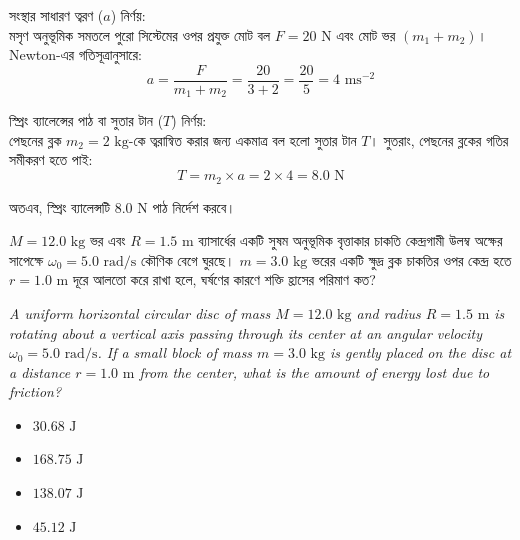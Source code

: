 \documentclass[12pt, a4paper]{article}
\begin{document}
{%
\begin{tcolorbox}[solutionbox={সমাধান (Solution)}]
\noindent
সংস্থার সাধারণ ত্বরণ ($a$) নির্ণয়:\\
মসৃণ অনুভূমিক সমতলে পুরো সিস্টেমের ওপর প্রযুক্ত মোট বল $F = 20\text{ N}$ এবং মোট ভর $(m_1 + m_2)$। Newton-এর গতিসূত্রানুসারে:
$$a = \frac{F}{m_1 + m_2} = \frac{20}{3 + 2} = \frac{20}{5} = 4\text{ ms}^{-2}$$

স্প্রিং ব্যালেন্সের পাঠ বা সুতার টান ($T$) নির্ণয়:\\
পেছনের ব্লক $m_2 = 2\text{ kg}$-কে ত্বরান্বিত করার জন্য একমাত্র বল হলো সুতার টান $T$। সুতরাং, পেছনের ব্লকের গতির সমীকরণ হতে পাই:
$$T = m_2 \times a = 2 \times 4 = 8.0\text{ N}$$

অতএব, স্প্রিং ব্যালেন্সটি $8.0\text{ N}$ পাঠ নির্দেশ করবে।
\end{tcolorbox}
\vspace{1em}

\begin{tcolorbox}[questionbox={প্রশ্ন (Question) 19}]
\noindent
$M = 12.0\text{ kg}$ ভর এবং $R = 1.5\text{ m}$ ব্যাসার্ধের একটি সুষম অনুভূমিক বৃত্তাকার চাকতি কেন্দ্রগামী উলম্ব অক্ষের সাপেক্ষে $\omega_0 = 5.0\text{ rad/s}$ কৌণিক বেগে ঘুরছে। $m = 3.0\text{ kg}$ ভরের একটি ক্ষুদ্র ব্লক চাকতির ওপর কেন্দ্র হতে $r = 1.0\text{ m}$ দূরে আলতো করে রাখা হলে, ঘর্ষণের কারণে শক্তি হ্রাসের পরিমাণ কত?
\vspace{0.8em}
\begin{english}
\noindent\textit{\color{darkgray}
A uniform horizontal circular disc of mass $M = 12.0\text{ kg}$ and radius $R = 1.5\text{ m}$ is rotating about a vertical axis passing through its center at an angular velocity $\omega_0 = 5.0\text{ rad/s}$. If a small block of mass $m = 3.0\text{ kg}$ is gently placed on the disc at a distance $r = 1.0\text{ m}$ from the center, what is the amount of energy lost due to friction?
}
\end{english}
\end{tcolorbox}

\begin{itemize}[label={}, leftmargin=1cm, itemsep=0.5em]
\item[\textbf{A)}] $30.68\text{ J}$
\item[\textbf{B)}] $168.75\text{ J}$
\item[\textbf{C)}] $138.07\text{ J}$
\item[\textbf{D)}] $45.12\text{ J}$
\end{itemize}
\vspace{0.5em}

}
\end{document}
